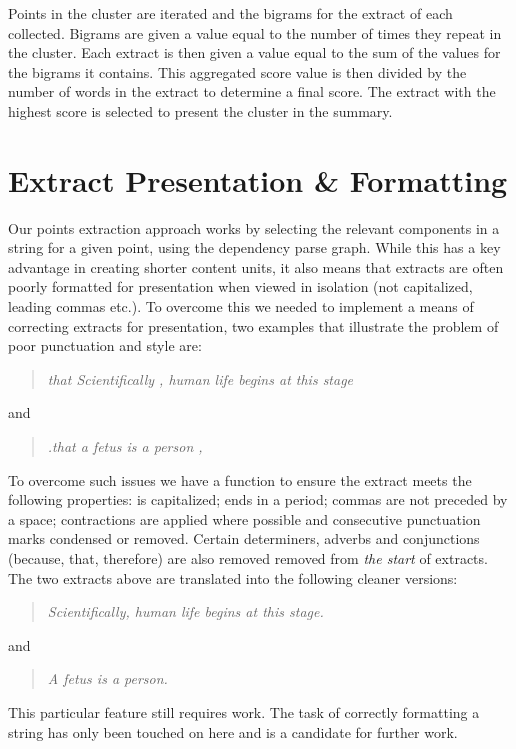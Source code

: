     Points in the cluster are iterated and the bigrams for the extract of each collected. Bigrams are given a value equal to the number of times they repeat in the cluster. Each extract is then given a value equal to the sum of the values for the bigrams it contains. This aggregated score value is then divided by the number of words in the extract to determine a final score. The extract with the highest score is selected to present the cluster in the summary.

  \section{Extract Presentation \& Formatting}
    Our points extraction approach works by selecting the relevant components in a string for a given point, using the dependency parse graph. While this has a key advantage in creating shorter content units, it also means that extracts are often poorly formatted for presentation when viewed in isolation (not capitalized, leading commas etc.). To overcome this we needed to implement a means of correcting extracts for presentation, two examples that illustrate the problem of poor punctuation and style are: \blockquote{\textit{that Scientifically , human life begins at this stage}} and \blockquote{\textit{.that a fetus is a person ,}}.

    To overcome such issues we have a function to ensure the extract meets the following properties: is capitalized; ends in a period; commas are not preceded by a space; contractions are applied where possible and consecutive punctuation marks condensed or removed. Certain determiners, adverbs and conjunctions (because, that, therefore) are also removed removed from \textit{the start} of extracts. The two extracts above are translated into the following cleaner versions: \blockquote{\textit{Scientifically, human life begins at this stage.}} and \blockquote{\textit{A fetus is a person.}}.

    This particular feature still requires work. The task of correctly formatting a string has only been touched on here and is a candidate for further work.

